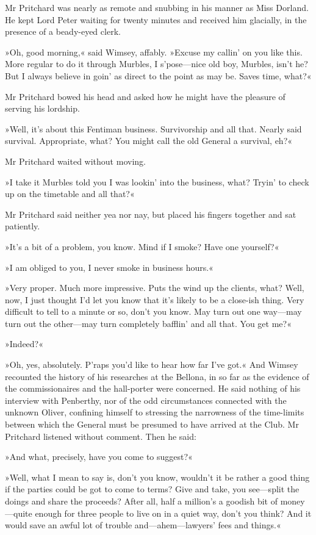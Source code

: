 Mr Pritchard was nearly as remote and snubbing in his manner as Miss Dorland. He kept Lord Peter waiting for twenty minutes and received him glacially, in the presence of a beady-eyed clerk.

»Oh, good morning,« said Wimsey, affably. »Excuse my callin' on you like this. More regular to do it through Murbles, I s'pose\allowbreak---\allowbreak nice old boy, Murbles, isn't he? But I always believe in goin' as direct to the point as may be. Saves time, what?«

Mr Pritchard bowed his head and asked how he might have the pleasure of serving his lordship.

»Well, it's about this Fentiman business. Survivorship and all that. Nearly said survival. Appropriate, what? You might call the old General a survival, eh?«

Mr Pritchard waited without moving.

»I take it Murbles told you I was lookin' into the business, what? Tryin' to check up on the timetable and all that?«

Mr Pritchard said neither yea nor nay, but placed his fingers together and sat patiently.

»It's a bit of a problem, you know. Mind if I smoke? Have one yourself?«

»I am obliged to you, I never smoke in business hours.«

»Very proper. Much more impressive. Puts the wind up the clients, what? Well, now, I just thought I'd let you know that it's likely to be a close-ish thing. Very difficult to tell to a minute or so, don't you know. May turn out one way\allowbreak---\allowbreak may turn out the other\allowbreak---\allowbreak may turn completely bafflin' and all that. You get me?«

»Indeed?«

»Oh, yes, absolutely. P'raps you'd like to hear how far I've got.« And Wimsey recounted the history of his researches at the Bellona, in so far as the evidence of the commissionaires and the hall-porter were concerned. He said nothing of his interview with Penberthy, nor of the odd circumstances connected with the unknown Oliver, confining himself to stressing the narrowness of the time-limits between which the General must be presumed to have arrived at the Club. Mr Pritchard listened without comment. Then he said:

»And what, precisely, have you come to suggest?«

»Well, what I mean to say is, don't you know, wouldn't it be rather a good thing if the parties could be got to come to terms? Give and take, you see\allowbreak---\allowbreak split the doings and share the proceeds? After all, half a million's a goodish bit of money\allowbreak---\allowbreak quite enough for three people to live on in a quiet way, don't you think? And it would save an awful lot of trouble and\allowbreak---\allowbreak ahem---lawyers' fees and things.«

